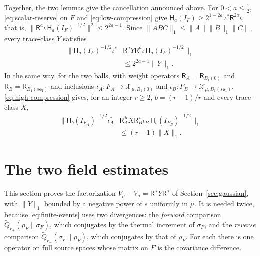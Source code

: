 \documentclass[aps,prl,reprint,longbibliography,raggedbottom]{revtex4-2}
\newcommand{\norm}[1]{\lVert #1\rVert}
\newcommand{\Res}{\mathsf R}
\newcommand{\Therm}{\mathsf H}
\newcommand{\Qtil}{\widetilde Q}
\newcommand{\eone}{\mathbf e_1}
\begin{document}
Together, the two lemmas give the cancellation announced above.
For $0<a\le\frac12$, \eqref{eq:scalar-reserve} on $F$ and
\eqref{eq:low-compression} give
$\Therm_a(I_F)\ge2^{1-2a}\,\iota^*\Res^{2a}\iota$, that is,
$\norm{\Res^a\iota\,\Therm_a(I_F)^{-1/2}}^2\le2^{2a-1}$. Since
$\norm{ABC}_1\le\norm A\norm B_1\norm C$, every trace-class $Y$
satisfies
\begin{equation}
\begin{split}
\bigl\|\Therm_a(I_F)^{-1/2}\iota^*&\Res^aY\Res^a\iota\,
\Therm_a(I_F)^{-1/2}\bigr\|_1\\
&\le2^{2a-1}\norm Y_1 .
\end{split}
\label{eq:one-space}
\end{equation}
In the same way, for the two balls, with weight operators
$\Res_A=\Res_{B_1(0)}$ and $\Res_B=\Res_{B_1(s\eone)}$ and inclusions
$\iota_A\colon F_A\to\mathcal X_{\mu,B_1(0)}$ and
$\iota_B\colon F_B\to\mathcal X_{\mu,B_1(s\eone)}$,
\eqref{eq:high-compression} gives, for an integer $r\ge2$,
$b=(r-1)/r$ and every trace-class $X$,
\begin{equation}
\begin{split}
\bigl\|\Therm_b(I_{F_A})^{-1/2}\iota_A^*&\Res_A^{\,b}X\Res_B^{\,b}
\iota_B\,\Therm_b(I_{F_B})^{-1/2}\bigr\|_1\\
&\le(r-1)\norm X_1 .
\end{split}
\label{eq:trace-compression}
\end{equation}

\section{The two field estimates}\label{sec:estimates}

This section proves the factorization
$V_\rho-V_\sigma=\Res^{\,\tau}Y\Res^{\,\tau}$ of
Section~\ref{sec:gaussian}, with $\norm Y_1$ bounded by a negative
power of $s$ uniformly in $\mu$. It is needed twice, because
\eqref{eq:finite-events} uses two divergences: the \emph{forward}
comparison $\Qtil_{r_+}(\rho_F\|\sigma_F)$, which conjugates by the
thermal increment of $\sigma_F$, and the \emph{reverse} comparison
$\Qtil_{r_-}(\sigma_F\|\rho_F)$, which conjugates by that of $\rho_F$.
For each there is one operator on full source spaces whose matrix on
$F$ is the covariance difference.
\end{document}
